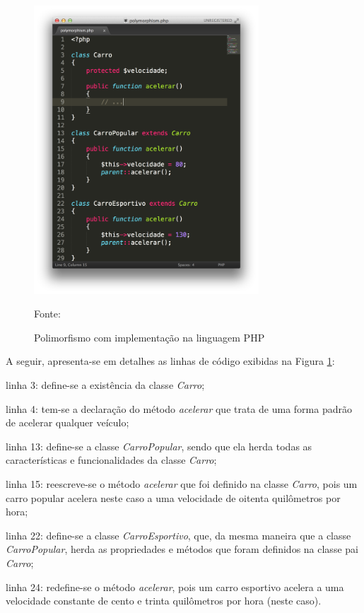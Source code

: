 \begin{figure}[h!tb]
	\caption{Polimorfismo com implementação na linguagem PHP}
	\label{fig:polimorfismo}

	\centering
	\includegraphics[width=0.75\textwidth]{images/polymorphism.png}

	\centering
	\footnotesize Fonte: \fonteOAutor
\end{figure}

\FloatBarrier 	%

A seguir, apresenta-se em detalhes as linhas de código exibidas na Figura
\ref{fig:polimorfismo}:

\begin{alineas}
    \item linha 3: define-se a existência da classe \textit{Carro};
    \item linha 4: tem-se a declaração do método \textit{acelerar} que trata de
    uma forma padrão de acelerar qualquer veículo;
    \item linha 13: define-se a classe \textit{CarroPopular}, sendo que ela
    herda todas as características e funcionalidades da classe \textit{Carro};
    \item linha 15: reescreve-se o método \textit{acelerar} que foi definido na
    classe \textit{Carro}, pois um carro popular acelera neste caso a uma
    velocidade de oitenta quilômetros por hora;
    \item linha 22: define-se a classe \textit{CarroEsportivo}, que, da mesma
    maneira que a classe \textit{CarroPopular}, herda as propriedades e métodos
    que foram definidos na classe pai \textit{Carro};
    \item linha 24: redefine-se o método \textit{acelerar}, pois um carro
    esportivo acelera a uma velocidade constante de cento e trinta quilômetros
    por hora (neste caso).
\end{alineas}

